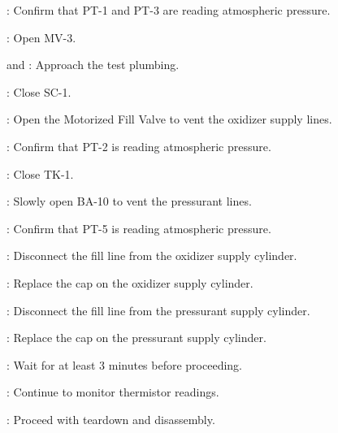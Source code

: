 \begin{checklist}
    \item \daq{}: Confirm that PT-1 and PT-3 are reading atmospheric pressure.
    \item \control{}: Open MV-3.
    \item \primary{} and \secondary{}: Approach the test plumbing.
    \item \primary{}: Close SC-1.
    \item \control{}: Open the Motorized Fill Valve to vent the oxidizer supply lines.
    \item \daq{}: Confirm that PT-2 is reading atmospheric pressure.
	\item \primary{}: Close TK-1.
	\item \primary{}: Slowly open BA-10 to vent the pressurant lines.
    \item \daq{}: Confirm that PT-5 is reading atmospheric pressure.
    \item \primary{}: Disconnect the fill line from the oxidizer supply cylinder.
    \item \primary{}: Replace the cap on the oxidizer supply cylinder.
    \item \primary{}: Disconnect the fill line from the pressurant supply cylinder.
    \item \primary{}: Replace the cap on the pressurant supply cylinder.
    \item \ops{}: Wait for at least 3 minutes before proceeding.
    \item \daq{}: Continue to monitor thermistor readings.
    \item \ops{}: Proceed with teardown and disassembly.

\end{checklist}
\setcounter{checklistnum}{0}


